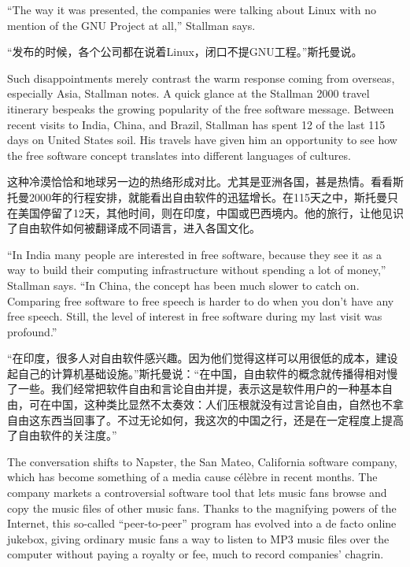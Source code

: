 \ifdefined\eng
``The way it was presented, the companies were talking about Linux with no mention of the GNU Project at all,'' Stallman says.
\fi

\ifdefined\chs
``发布的时候，各个公司都在说着Linux，闭口不提GNU工程。''斯托曼说。
\fi

\ifdefined\eng
Such disappointments merely contrast the warm response coming from overseas, especially Asia, Stallman notes. A quick glance at the Stallman 2000 travel itinerary bespeaks the growing popularity of the free software message. Between recent visits to India, China, and Brazil, Stallman has spent 12 of the last 115 days on United States soil. His travels have given him an opportunity to see how the free software concept translates into different languages of cultures.
\fi

\ifdefined\chs
这种冷漠恰恰和地球另一边的热络形成对比。尤其是亚洲各国，甚是热情。看看斯托曼2000年的行程安排，就能看出自由软件的迅猛增长。在115天之中，斯托曼只在美国停留了12天，其他时间，则在印度，中国或巴西境内。他的旅行，让他见识了自由软件如何被翻译成不同语言，进入各国文化。
\fi

\ifdefined\eng
``In India many people are interested in free software, because they see it as a way to build their computing infrastructure without spending a lot of money,'' Stallman says. ``In China, the concept has been much slower to catch on. Comparing free software to free speech is harder to do when you don't have any free speech. Still, the level of interest in free software during my last visit was profound.''
\fi

\ifdefined\chs
``在印度，很多人对自由软件感兴趣。因为他们觉得这样可以用很低的成本，建设起自己的计算机基础设施。''斯托曼说：``在中国，自由软件的概念就传播得相对慢了一些。我们经常把软件自由和言论自由并提，表示这是软件用户的一种基本自由，可在中国，这种类比显然不太奏效：人们压根就没有过言论自由，自然也不拿自由这东西当回事了。不过无论如何，我这次的中国之行，还是在一定程度上提高了自由软件的关注度。''
\fi

\ifdefined\eng
The conversation shifts to Napster, the San Mateo, California software company, which has become something of a media cause célèbre in recent months. The company markets a controversial software tool that lets music fans browse and copy the music files of other music fans. Thanks to the magnifying powers of the Internet, this so-called ``peer-to-peer'' program has evolved into a de facto online jukebox, giving ordinary music fans a way to listen to MP3 music files over the computer without paying a royalty or fee, much to record companies' chagrin.
\fi


